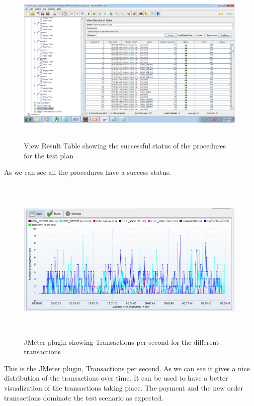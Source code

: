 \documentclass[12pt]{book}
\begin{document}
   \begin{figure}[H]
    \centering
    \includegraphics[width=15cm, height=8cm]{images/ntpcc_95}
    \caption{View Result Table showing the successful status of the procedures for the test plan\label{fig:fig79_JMeter}}
   \end{figure}
   
   As we can see all the procedures have a success status.\\
   
  \begin{figure}[H]
    \centering
    \includegraphics[width=15cm, height=8cm]{images/ntpcc_96}
    \caption{JMeter plugin showing Transactions per second for the different transactions\label{fig:fig80_JMeter}}
   \end{figure}
   
   This is the JMeter plugin, Transactions per second. As we can see it gives a nice distribution of the transactions over time.
   It can be used to have a better visualization of the transactions taking place. The payment and the new order transactions dominate the test scenario as expected.
   
\end{document}
